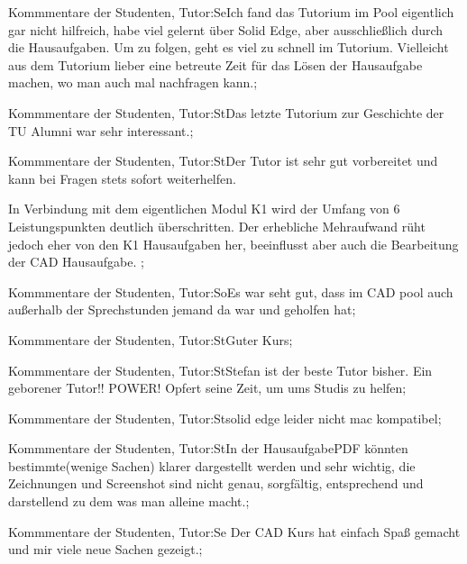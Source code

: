 \documentclass[10pt]{beamer}
\begin{document}
\begin{frame}[fragile]{Kommmentare der Studenten, Tutor:Se}Ich fand das Tutorium im Pool eigentlich gar nicht hilfreich, habe viel gelernt über Solid Edge, aber ausschließlich durch die Hausaufgaben. Um zu folgen, geht es viel zu schnell im Tutorium. Vielleicht aus dem Tutorium lieber eine betreute Zeit für das Lösen der Hausaufgabe machen, wo man auch mal nachfragen kann.;
 \end{frame}
\begin{frame}[fragile]{Kommmentare der Studenten, Tutor:St}Das letzte Tutorium zur Geschichte der TU Alumni war sehr interessant.;
 \end{frame}
\begin{frame}[fragile]{Kommmentare der Studenten, Tutor:St}Der Tutor ist sehr gut vorbereitet und kann bei Fragen stets sofort weiterhelfen. 
 
 In Verbindung mit dem eigentlichen Modul K1 wird der Umfang von 6 Leistungspunkten deutlich überschritten. Der erhebliche Mehraufwand rüht jedoch eher von den K1 Hausaufgaben her, beeinflusst aber auch die Bearbeitung der CAD Hausaufgabe. ;
 \end{frame}
\begin{frame}[fragile]{Kommmentare der Studenten, Tutor:So}Es war seht gut, dass im CAD pool auch außerhalb der Sprechstunden jemand da war und geholfen hat;
 \end{frame}
\begin{frame}[fragile]{Kommmentare der Studenten, Tutor:St}Guter Kurs;
 \end{frame}
\begin{frame}[fragile]{Kommmentare der Studenten, Tutor:St}Stefan ist der beste Tutor bisher. Ein geborener Tutor!! POWER! Opfert seine Zeit, um ums Studis zu helfen;
 \end{frame}
\begin{frame}[fragile]{Kommmentare der Studenten, Tutor:St}solid edge leider nicht mac kompatibel;
 \end{frame}
\begin{frame}[fragile]{Kommmentare der Studenten, Tutor:St}In der HausaufgabePDF könnten bestimmte(wenige Sachen) klarer dargestellt werden und sehr wichtig, die Zeichnungen und Screenshot sind nicht genau, sorgfältig, entsprechend und darstellend zu dem was man alleine macht.;
 \end{frame}
\begin{frame}[fragile]{Kommmentare der Studenten, Tutor:Se}
 Der CAD Kurs hat einfach Spaß gemacht und mir viele neue Sachen gezeigt.;
 \end{frame}
\end{document}

